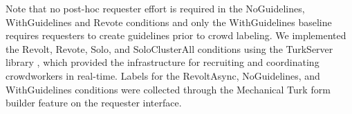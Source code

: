 Note that no post-hoc requester effort is required in the NoGuidelines, WithGuidelines and Revote conditions and only the WithGuidelines baseline requires requesters to create guidelines prior to crowd labeling. We implemented the Revolt, Revote, Solo, and SoloClusterAll conditions using the TurkServer library \cite{mao12:turkserver}, which provided the infrastructure for recruiting and coordinating crowdworkers in real-time. Labels for the RevoltAsync, NoGuidelines, and WithGuidelines conditions were collected through the Mechanical Turk form builder feature on the requester interface. %







